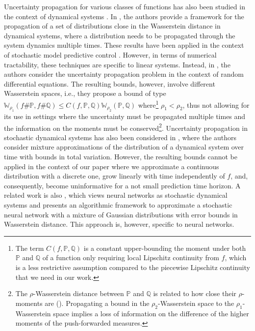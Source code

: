 \documentclass[11pt, a4paper, oneside,reqno]{amsart}
\theoremstyle{plain}
\def\prob{\mathbb{P}}
\def\probQ{\mathbb{Q}}
\def\wasserstein{{\mathbb{W}}}
\begin{document}
Uncertainty propagation for various classes of functions has also been studied in the context of dynamical systems \cite{landgraf2023probabilistic}.
In \cite{aolaritei2022distributional}, the authors provide a framework for the propagation of a set of distributions close in the Wasserstein distance in dynamical systems, where a distribution needs to be propagated through the system dynamics multiple times. These results have been applied in the context of stochastic model predictive control \cite{aolaritei2023wasserstein, mcallister2024distributionally}. However, in terms of numerical tractability, these techniques are specific to linear systems. 
Instead, in \cite{ernst2022wasserstein}, the authors consider the uncertainty propagation problem in the context of random differential equations. The resulting bounds, however, involve different Wasserstein spaces, i.e., they propose a bound of type $\wasserstein_{\rho_1}(f\#\prob, f\#\probQ) \leq C(f, \prob, \probQ) \wasserstein_{\rho_2}(\prob, \probQ)$ where\footnote{The term $C(f, \prob, \probQ)$ is a constant upper-bounding the moment under both $\prob$ and $\probQ$ of a function only requiring local Lipschitz continuity from $f$, which is a less restrictive assumption compared to the piecewise Lipschitz continuity that we need in our work.} $\rho_1 < \rho_2$, thus not allowing for its use in settings where the uncertainty must be propagated multiple times and the information on the moments must be conserved\footnote{The $\rho$-Wasserstein distance between $\prob$ and $\probQ$ is related to how close their $\rho$-moments are (\cite{villani2009optimal, adams2024finite}). Propagating a bound in the $\rho_2$-Wasserstein space to the $\rho_1$-Wasserstein space implies a loss of information on the difference of the higher moments of the push-forwarded measures.}. Uncertainty propagation in stochastic dynamical systems has also been considered in 
\cite{figueiredo2024uncertainty}, where the authors consider mixture approximations of the distribution of a dynamical system over time with bounds in total variation. However, the resulting bounds cannot be applied in the context of our paper where we approximate a continuous distribution with a discrete one,  grow linearly with time independently of $f$, and, consequently, become uninformative for a not small prediction time horizon.  %
A related work is also \cite{adams2024finite}, which views neural networks as stochastic dynamical systems and presents an algorithmic framework to approximate a stochastic neural network with a mixture of Gaussian distributions with error bounds in Wasserstein distance. This approach is, however, specific to neural networks.
\end{document}
